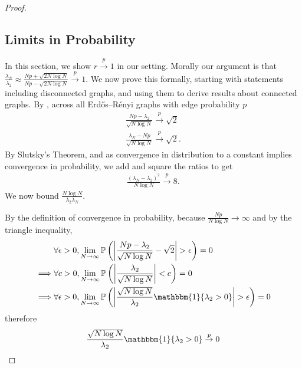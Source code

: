 \begin{proof}
\subsection{Limits in Probability}
In this section, we show $r \overset{p}{\to} 1$ in our setting. Morally our argument is that $\frac{\lambda_{N}}{\lambda_{2}} \approx \frac{Np + \sqrt{2N\log N}}{Np - \sqrt{2N\log N}} \overset{p}{\to} 1$. We now prove this formally, starting with statements including disconnected graphs, and using them to derive results about connected graphs.
By \cite[Theorem 1 (i) \& (ii)]{jiang2012low}, across all Erdős–Rényi graphs with edge probability $p$
\begin{align}  
    \frac{ Np - \lambda_{2}}{\sqrt{N\log N}} \overset{p}{\to} \sqrt{2} \\
    \frac{ \lambda_{N} - Np}{\sqrt{N\log N}} \overset{p}{\to} \sqrt{2}.
\end{align}
By Slutsky's Theorem, and as convergence in distribution to a constant implies convergence in probability, we add and square the ratios to get
\begin{align}
    \frac{\left(\lambda_{N} - \lambda_{2}\right)^{2}}{N\log N} \overset{p}{\to} 8. \label{eq:proof_by_slutsky_sq_diff}
\end{align}
We now bound $\frac{N\log N}{\lambda_{2}\lambda_{N}}$. 

By the definition of convergence in probability, because $\frac{Np}{N \log N} \to \infty$ and by the triangle inequality,
\begin{align}
    &\forall \epsilon > 0, \lim_{N \to \infty}\mathbb{P}\left( \left\lvert \frac{ Np - \lambda_{2}}{\sqrt{N\log N}} - \sqrt{2} \right\rvert > \epsilon \right) = 0 \\
    \implies &\forall c > 0, \lim_{N \to \infty}\mathbb{P}\left( \left\lvert \frac{ \lambda_{2}}{\sqrt{N\log N}} \right\rvert < c \right) = 0 \label{eq:Proof_limit_prob_connected} \\
    \implies &\forall \epsilon > 0, \lim_{N \to \infty}\mathbb{P}\left( \left\lvert \frac{\sqrt{N\log N}}{ \lambda_{2}} \mathbbm{1}\{\lambda_{2} > 0\}\right\rvert > \epsilon  \right) = 0
\end{align}
therefore
\begin{align}
    \frac{\sqrt{N\log N}}{ \lambda_{2}} \mathbbm{1}\{ \lambda_{2} > 0 \} \overset{p}{\to} 0

\end{align}
\end{proof}
